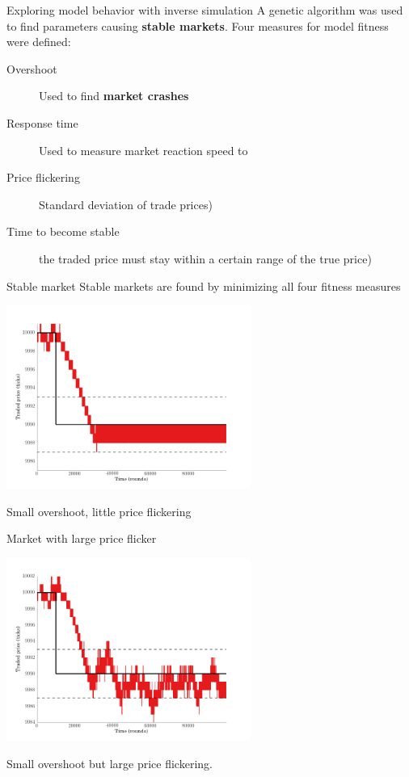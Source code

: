 \documentclass[14pt]{beamer}
\begin{document}
\begin{frame}{Exploring model behavior with inverse simulation}
A genetic algorithm was used to find parameters causing \textbf{stable markets}. Four measures for model fitness were defined:
\pause
\begin{small}
\begin{description}
\item[Overshoot] Used to find \textbf{market crashes}
\item[Response time] Used to measure market reaction speed to 
\item[Price flickering] Standard deviation of trade prices)
\item[Time to become stable] the traded price must stay within a certain range of the true price)
\end{description}
\end{small}
\end{frame}

\begin{frame}{Stable market}
Stable markets are found by minimizing all four fitness measures
\begin{center}
\includegraphics[width=0.6\textwidth]{market_cases/a_stable_within_margin.png}
\end{center}
\pause
Small overshoot, little price flickering
\end{frame}

\begin{frame}{Market with large price flicker}
\begin{center}
\includegraphics[width=0.6\textwidth]{market_cases/b_flicker_but_mostly_within_margin.png}
\end{center}
Small overshoot but large price flickering.
\end{frame}
 
\end{document}
